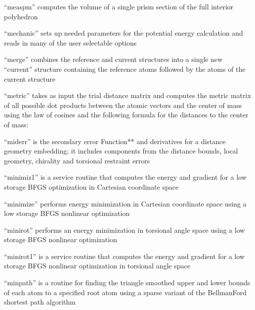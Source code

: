 \documentclass[letterpaper,11pt,english]{sphinxmanual}
\begin{document}
“measpm” computes the volume of a single prism section of the full interior polyhedron


“mechanic” sets up needed parameters for the potential energy calculation and reads in many of the user selectable options


“merge” combines the reference and current structures into a single new “current” structure containing the reference atoms followed by the atoms of the current structure


“metric” takes as input the trial distance matrix and computes the metric matrix of all possible dot products between the atomic vectors and the center of mass using the law of cosines and the following formula for the distances to the center of mass:


“miderr” is the secondary error Function** and derivatives for a distance geometry embedding; it includes components from the distance bounds, local geometry, chirality and torsional restraint errors


“minimiz1” is a service routine that computes the energy and gradient for a low storage BFGS optimization in Cartesian coordinate space


“minimize” performs energy minimization in Cartesian coordinate space using a low storage BFGS nonlinear optimization


“minirot” performs an energy minimization in torsional angle space using a low storage BFGS nonlinear optimization


“minirot1” is a service routine that computes the energy and gradient for a low storage BFGS nonlinear optimization in torsional angle space


“minpath” is a routine for finding the triangle smoothed upper and lower bounds of each atom to a specified root atom using a sparse variant of the Bellman\sphinxhyphen{}Ford shortest path algorithm
\end{document}

